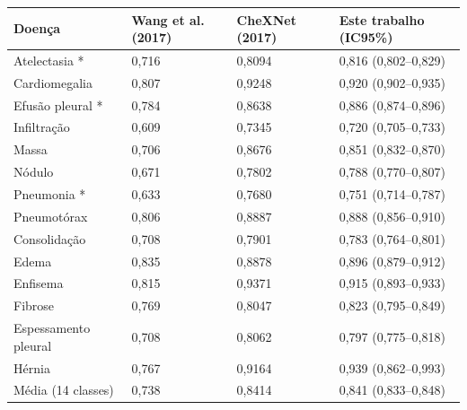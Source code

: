 \begin{tabular}{llll}
\toprule
Doença & Wang et al. (2017) & CheXNet (2017) & Este trabalho (IC95\%) \\
\midrule
Atelectasia * & 0,716 & 0,8094 & 0,816 (0,802–0,829) \\
Cardiomegalia & 0,807 & 0,9248 & 0,920 (0,902–0,935) \\
Efusão pleural * & 0,784 & 0,8638 & 0,886 (0,874–0,896) \\
Infiltração & 0,609 & 0,7345 & 0,720 (0,705–0,733) \\
Massa & 0,706 & 0,8676 & 0,851 (0,832–0,870) \\
Nódulo & 0,671 & 0,7802 & 0,788 (0,770–0,807) \\
Pneumonia * & 0,633 & 0,7680 & 0,751 (0,714–0,787) \\
Pneumotórax & 0,806 & 0,8887 & 0,888 (0,856–0,910) \\
Consolidação & 0,708 & 0,7901 & 0,783 (0,764–0,801) \\
Edema & 0,835 & 0,8878 & 0,896 (0,879–0,912) \\
Enfisema & 0,815 & 0,9371 & 0,915 (0,893–0,933) \\
Fibrose & 0,769 & 0,8047 & 0,823 (0,795–0,849) \\
Espessamento pleural & 0,708 & 0,8062 & 0,797 (0,775–0,818) \\
Hérnia & 0,767 & 0,9164 & 0,939 (0,862–0,993) \\
Média (14 classes) & 0,738 & 0,8414 & 0,841 (0,833–0,848) \\
\bottomrule
\end{tabular}
